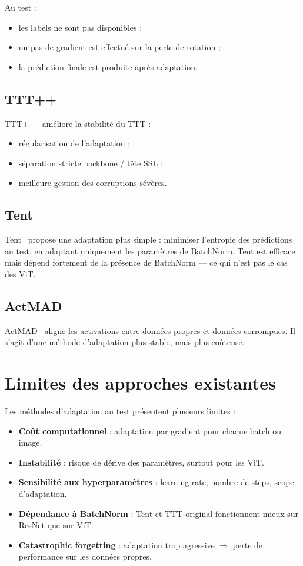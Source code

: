 \documentclass[12pt,a4paper]{report}
\begin{document}
	Au test :
	\begin{itemize}
		\item les labels ne sont pas disponibles ;
		\item un pas de gradient est effectué sur la perte de rotation ;
		\item la prédiction finale est produite après adaptation.
	\end{itemize}
	
	\subsection{TTT++}
	
	TTT++~\cite{Liu2021} améliore la stabilité du TTT :
	\begin{itemize}
		\item régularisation de l’adaptation ;
		\item séparation stricte backbone / tête SSL ;
		\item meilleure gestion des corruptions sévères.
	\end{itemize}
	
	\subsection{Tent}
	
	Tent~\cite{Wang2021} propose une adaptation plus simple :  
	minimiser l’entropie des prédictions au test, en adaptant uniquement les paramètres de BatchNorm.  
	Tent est efficace mais dépend fortement de la présence de BatchNorm — ce qui n’est pas le cas des ViT.
	
	\subsection{ActMAD}
	
	ActMAD~\cite{Mirza2023} aligne les activations entre données propres et données corrompues.  
	Il s’agit d’une méthode d’adaptation plus stable, mais plus coûteuse.
	
	\section{Limites des approches existantes}
	
	Les méthodes d’adaptation au test présentent plusieurs limites :
	
	\begin{itemize}
		\item \textbf{Coût computationnel} : adaptation par gradient pour chaque batch ou image.
		\item \textbf{Instabilité} : risque de dérive des paramètres, surtout pour les ViT.
		\item \textbf{Sensibilité aux hyperparamètres} : learning rate, nombre de steps, scope d’adaptation.
		\item \textbf{Dépendance à BatchNorm} : Tent et TTT original fonctionnent mieux sur ResNet que sur ViT.
		\item \textbf{Catastrophic forgetting} : adaptation trop agressive $\Rightarrow$ perte de performance sur les données propres.
	\end{itemize}
	
\end{document}
